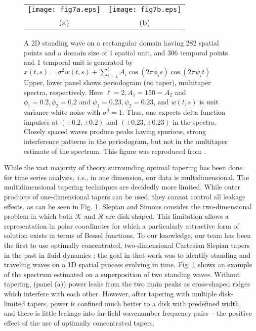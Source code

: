 \begin{figure}[!t]
  \begin{tabular}{cc} 
    \texttt{[image: fig7a.eps]} &
    \texttt{[image: fig7b.eps]} \\ 
    (a) & (b)
  \end{tabular}
  \caption{\label{fig:leakage} A 2D standing wave on a rectangular domain having 282
spatial points and a domain size of 1 spatial unit, and 306 temporal points and 1
temporal unit is generated by $x(t,s) = \sigma^2 w(t,s) + \sum_{i=1}^{\ell} A_i \cos
(2 \pi \phi_i s) \cos (2 \pi \psi_i t)$ Upper, lower panel shows periodogram (no
taper), multitaper spectra, respectively. Here $\ell = 2, A_1 = 150 = A_2$ and
$\phi_1 = 0.2, \phi_2 = 0.2$ and $\psi_1 = 0.23, \psi_2 = 0.23$, and $w(t,s)$ is unit
variance white noise with $\sigma^2 = 1$. Thus, one expects delta function impulses
at $(\pm0.2, \pm0.2)$ and $(\pm0.23,\pm0.23)$ in the spectra. Closely spaced waves
produce peaks having spurious, strong interference patterns in the periodogram, but
not in the multitaper estimate of the spectrum. This figure was reproduced from
\cite{geoga2018}.}
\end{figure}

While the vast majority of theory surrounding optimal tapering has been done for time
series analysis, \textit{i.e.}, in one dimension, our data is multidimensional. The
multidimensional tapering techniques are decidedly more limited. While outer products
of one-dimensional tapers can be used, they cannot control all leakage effects, as
can be seen in Fig. \ref{fig:leakage}. Slepian \cite{slepian1964} and Simons
\cite{simons2011} consider the two-dimensional problem in which both $\mathcal{K}$
and $\mathcal{R}$ are disk-shaped. This limitation allows a representation in polar
coordinates for which a particularly attractive form of solution exists in terms of
Bessel functions. To our knowledge, our team has been the first to use optimally
concentrated, two-dimensional Cartesian Slepian tapers in the past in fluid dynamics
\cite{geoga2018};  the goal in that work was to identify standing and traveling waves
on a 1D spatial process evolving in time. Fig. \ref{fig:leakage} shows an example of
the spectrum estimated on a superposition of two standing waves. Without tapering,
(panel (a)) power leaks from the two main peaks as cross-shaped ridges which
interfere with each other. However, after tapering with multiple disk-limited tapers,
power is confined much better to a disk with predefined width, and there is little
leakage into far-field wavenumber frequency pairs -- the positive effect of the use
of optimally concentrated tapers. 

